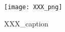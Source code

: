 
\begin{figure}[ht!]
    \centering
    \texttt{[image: XXX\_png]}
    \caption{XXX_caption}
    \label{XXX_label}
\end{figure}

